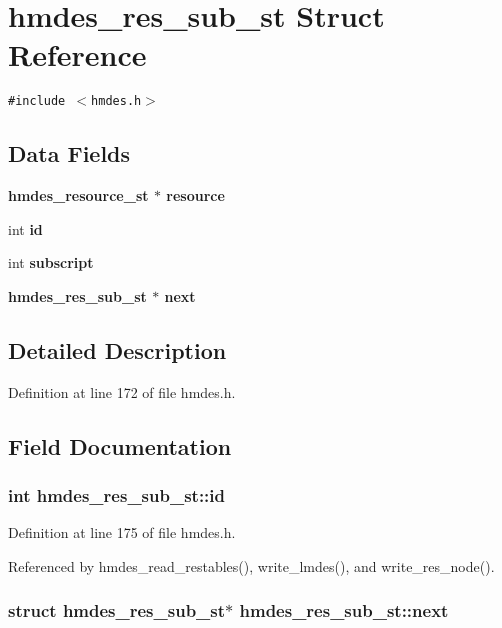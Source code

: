 \section{hmdes\_\-res\_\-sub\_\-st Struct Reference}
\label{structhmdes__res__sub__st}
{\tt \#include $<$hmdes.h$>$}

\subsection*{Data Fields}
\begin{CompactItemize}
\item 
\bf{hmdes\_\-resource\_\-st} $\ast$ \bf{resource}
\item 
int \bf{id}
\item 
int \bf{subscript}
\item 
\bf{hmdes\_\-res\_\-sub\_\-st} $\ast$ \bf{next}
\end{CompactItemize}


\subsection{Detailed Description}




Definition at line 172 of file hmdes.h.

\subsection{Field Documentation}
\subsubsection{\setlength{\rightskip}{0pt plus 5cm}int \bf{hmdes\_\-res\_\-sub\_\-st::id}}\label{structhmdes__res__sub__st_df002bb8dd1ed980b0c5085ed48ae395}




Definition at line 175 of file hmdes.h.

Referenced by hmdes\_\-read\_\-restables(), write\_\-lmdes(), and write\_\-res\_\-node().
\subsubsection{\setlength{\rightskip}{0pt plus 5cm}struct \bf{hmdes\_\-res\_\-sub\_\-st}$\ast$ \bf{hmdes\_\-res\_\-sub\_\-st::next}}\label{structhmdes__res__sub__st_c5c4aed47688209d449559dd50b45976}




